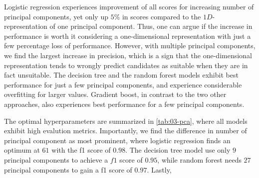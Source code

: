 Logistic regression experiences improvement of all scores for increasing number of principal components, yet only up $5\%$ in scores compared to the $1D$-representation of one principal component. Thus, one can argue if the increase in performance is worth it considering a one-dimensional representation with just a few percentage loss of performance. However, with multiple principal components, we find the largest increase in precision, which is a sign that the one-dimensional representation tends to wrongly predict candidates as suitable when they are in fact unsuitable. The decision tree and the random forest models exhibit best performance for just a few principal components, and experience considerable overfitting for larger values. Gradient boost, in contrast to the two other approaches, also experiences best performance for a few principal components.

\begin{table}[!ht]
\centering
\caption{A table of the optimal number of principal components and the respective scores (standard deviation) for the insightful approach, as visualized in the dash-dotted line in \autoref{fig:03-pca}.}
\label{tab:03-pca}
\noindent{}
\end{table}

The optimal hyperparameters are summarized in \autoref{tab:03-pca}, where all models exhibit high evalution metrics. Importantly, we find the difference in number of principal component as most prominent, where logistic regression finds an optimum at $61$ with the f1 score of $0.98$. The decision tree model use only $9$ principal components to achieve a $f1$ score of $0.95$, while random forest needs $27$ principal components to gain a f1 score of $0.97$. Lastly,

